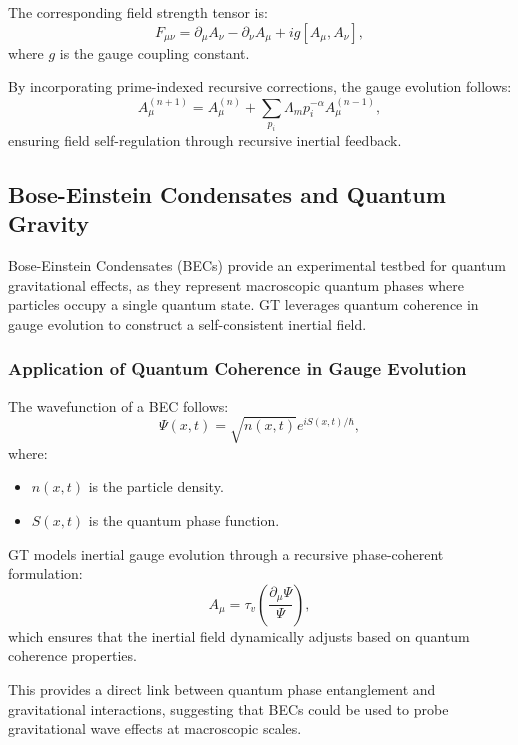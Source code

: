 \documentclass{article}
\theoremstyle{plain}
\begin{document}
The corresponding field strength tensor is:
\begin{equation}
    F_{\mu\nu} = \partial_{\mu} A_{\nu} - \partial_{\nu} A_{\mu} + i g [A_{\mu}, A_{\nu}],
\end{equation}
where $g$ is the gauge coupling constant.

By incorporating prime-indexed recursive corrections, the gauge evolution follows:
\begin{equation}
    A_{\mu}^{(n+1)} = A_{\mu}^{(n)} + \sum_{p_i} \Lambda_m p_i^{-\alpha} A_{\mu}^{(n-1)},
\end{equation}
ensuring field self-regulation through recursive inertial feedback.

\subsection{Bose-Einstein Condensates and Quantum Gravity}
Bose-Einstein Condensates (BECs) provide an experimental testbed for quantum gravitational effects, as they represent macroscopic quantum phases where particles occupy a single quantum state. GT leverages quantum coherence in gauge evolution to construct a self-consistent inertial field.

\subsubsection{Application of Quantum Coherence in Gauge Evolution}
The wavefunction of a BEC follows:
\begin{equation}
    \Psi(x,t) = \sqrt{n(x,t)} e^{i S(x,t) / \hbar},
\end{equation}
where:
\begin{itemize}
    \item $n(x,t)$ is the particle density.
    \item $S(x,t)$ is the quantum phase function.
\end{itemize}

GT models inertial gauge evolution through a recursive phase-coherent formulation:
\begin{equation}
    A_{\mu} = \tau_v \left( \frac{\partial_{\mu} \Psi}{\Psi} \right),
\end{equation}
which ensures that the inertial field dynamically adjusts based on quantum coherence properties.

This provides a direct link between quantum phase entanglement and gravitational interactions, suggesting that BECs could be used to probe gravitational wave effects at macroscopic scales.
\end{document}
